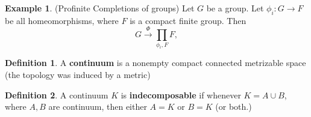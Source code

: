 \documentclass[10pt, oneside]{article}
\theoremstyle{definition}
\newtheorem{exmp}{Example}[section]
\newtheorem{defn}{Definition}
\begin{document}
\begin{exmp}
    (Profinite Completions of groups) Let $G$ be a group. Let $\phi_i : G \to F$ be all homeomorphisms, where $F$ is a compact finite group. Then 
    \[G \xrightarrow{\Phi} \prod_{\phi_i, F} F,\]
\end{exmp}

\begin{defn}
    A \textbf{continuum} is a nonempty compact connected metrizable space (the topology was induced by a metric)
\end{defn}

\begin{defn}
    A continuum $K$ is \textbf{indecomposable} if whenever $K = A \cup B$, where $A,B$ are continuum, then either $A = K$ or $B = K$ (or both.)
\end{defn}
\end{document}
